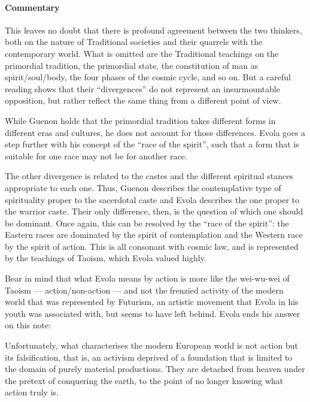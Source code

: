 \paragraph{Commentary}


This leaves no doubt that there is profound agreement between the two thinkers, both on the nature of Traditional societies and their quarrels with the contemporary world. What is omitted are the Traditional teachings on the primordial tradition, the primordial state, the constitution of man as spirit/soul/body, the four phases of the cosmic cycle, and so on. But a careful reading shows that their ``divergences'' do not represent an insurmountable opposition, but rather reflect the same thing from a different point of view.

While Guenon holds that the primordial tradition takes different forms in different eras and cultures, he does not account for those differences. Evola goes a step further with his concept of the ``race of the spirit'', such that a form that is suitable for one race may not be for another race.

The other divergence is related to the castes and the different spiritual stances appropriate to each one. Thus, Guenon describes the contemplative type of spirituality proper to the sacerdotal caste and Evola describes the one proper to the warrior caste. Their only difference, then, is the question of which one should be dominant. Once again, this can be resolved by the ``race of the spirit'': the Eastern races are dominated by the spirit of contemplation and the Western race by the spirit of action. This is all consonant with cosmic law, and is represented by the teachings of Taoism, which Evola valued highly.

Bear in mind that what Evola means by action is more like the wei-wu-wei of Taoism --- action/non-action --- and not the frenzied activity of the modern world that was represented by Futurism, an artistic movement that Evola in his youth was associated with, but seems to have left behind. Evola ends his answer on this note:

\begin{quotex}
Unfortunately, what characterises the modern European world is not action but its falsification, that is, an activism deprived of a foundation that is limited to the domain of purely material productions. They are detached from heaven under the pretext of conquering the earth, to the point of no longer knowing what action truly is.
\end{quotex}



